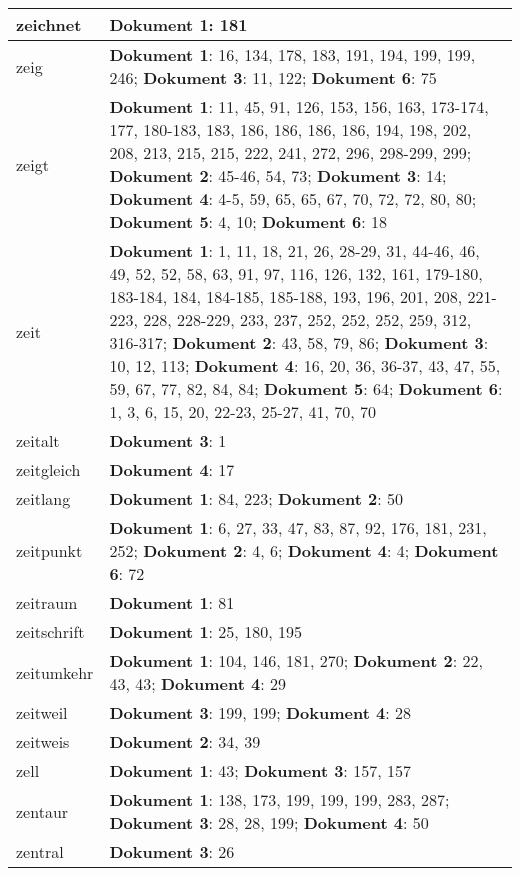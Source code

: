 \documentclass[a5paper]{article}
\begin{document}
\begin{longtable}[l]{|l|p{3in}|}
\hline
zeichnet & \textbf{Dokument 1}: 181 \\
\hline
zeig & \textbf{Dokument 1}: 16, 134, 178, 183, 191, 194, 199, 199, 246; \textbf{Dokument 3}: 11, 122; \textbf{Dokument 6}: 75 \\
\hline
zeigt & \textbf{Dokument 1}: 11, 45, 91, 126, 153, 156, 163, 173-174, 177, 180-183, 183, 186, 186, 186, 186, 194, 198, 202, 208, 213, 215, 215, 222, 241, 272, 296, 298-299, 299; \textbf{Dokument 2}: 45-46, 54, 73; \textbf{Dokument 3}: 14; \textbf{Dokument 4}: 4-5, 59, 65, 65, 67, 70, 72, 72, 80, 80; \textbf{Dokument 5}: 4, 10; \textbf{Dokument 6}: 18 \\
\hline
zeit & \textbf{Dokument 1}: 1, 11, 18, 21, 26, 28-29, 31, 44-46, 46, 49, 52, 52, 58, 63, 91, 97, 116, 126, 132, 161, 179-180, 183-184, 184, 184-185, 185-188, 193, 196, 201, 208, 221-223, 228, 228-229, 233, 237, 252, 252, 252, 259, 312, 316-317; \textbf{Dokument 2}: 43, 58, 79, 86; \textbf{Dokument 3}: 10, 12, 113; \textbf{Dokument 4}: 16, 20, 36, 36-37, 43, 47, 55, 59, 67, 77, 82, 84, 84; \textbf{Dokument 5}: 64; \textbf{Dokument 6}: 1, 3, 6, 15, 20, 22-23, 25-27, 41, 70, 70 \\
\hline
zeitalt & \textbf{Dokument 3}: 1 \\
\hline
zeitgleich & \textbf{Dokument 4}: 17 \\
\hline
zeitlang & \textbf{Dokument 1}: 84, 223; \textbf{Dokument 2}: 50 \\
\hline
zeitpunkt & \textbf{Dokument 1}: 6, 27, 33, 47, 83, 87, 92, 176, 181, 231, 252; \textbf{Dokument 2}: 4, 6; \textbf{Dokument 4}: 4; \textbf{Dokument 6}: 72 \\
\hline
zeitraum & \textbf{Dokument 1}: 81 \\
\hline
zeitschrift & \textbf{Dokument 1}: 25, 180, 195 \\
\hline
zeitumkehr & \textbf{Dokument 1}: 104, 146, 181, 270; \textbf{Dokument 2}: 22, 43, 43; \textbf{Dokument 4}: 29 \\
\hline
zeitweil & \textbf{Dokument 3}: 199, 199; \textbf{Dokument 4}: 28 \\
\hline
zeitweis & \textbf{Dokument 2}: 34, 39 \\
\hline
zell & \textbf{Dokument 1}: 43; \textbf{Dokument 3}: 157, 157 \\
\hline
zentaur & \textbf{Dokument 1}: 138, 173, 199, 199, 199, 283, 287; \textbf{Dokument 3}: 28, 28, 199; \textbf{Dokument 4}: 50 \\
\hline
zentral & \textbf{Dokument 3}: 26 \\

\end{longtable}
\end{document}
